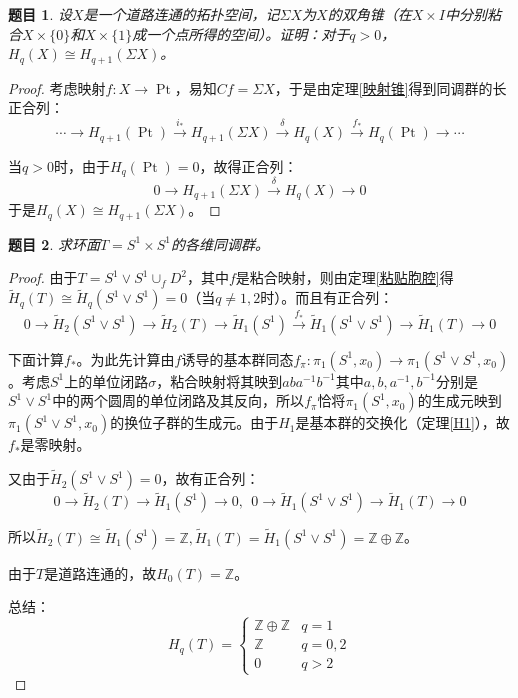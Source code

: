 \documentclass[UTF-8,11pt,fancyhdr,hyperref,titlepage]{ctexart}
\theoremstyle{question}
\newtheorem{timu}{题目}
\theoremstyle{theorem}
\theoremstyle{definition}
\theoremstyle{remark}
\def\ZZ{{\mathbb Z}}
\def\longto{\longrightarrow}
\def\To{\longto}
\newcommand{\markar}[1]{\stackrel{{#1}}{\longrightarrow}}%
\newcommand{\rH}[1]{\widetilde{H}_{#1}}
\DeclareMathOperator{\Pt}{Pt}
\begin{document}
\begin{timu}\label{24}
  设$X$是一个道路连通的拓扑空间，记$\Sigma X$为$X$的双角锥（在$X\times I$中分别粘合$X\times\{0\}$和$X\times\{1\}$成一个点所得的空间）。证明：对于$q>0$，$H_q(X)\cong H_{q+1}(\Sigma X)$。
\end{timu}
\begin{proof}
  考虑映射$f\colon X\To\Pt$，易知$Cf=\Sigma X$，于是由定理\ref{映射锥}得到同调群的长正合列：
  \begin{equation*}
    \cdots\To H_{q+1}(\Pt)\markar{i_{\ast}} H_{q+1}(\Sigma X)\markar{\delta} H_q(X)\markar{f_{\ast}} H_q(\Pt)\To\cdots
  \end{equation*}
  
  当$q>0$时，由于$H_q(\Pt)=0$，故得正合列：
  \begin{equation*}
    0\To H_{q+1}(\Sigma X)\markar{\delta} H_q(X)\To 0
  \end{equation*}
  于是$H_q(X)\cong H_{q+1}(\Sigma X)$。
\end{proof}

\begin{timu}\label{25}
  求环面$T=S^1\times S^1$的各维同调群。
\end{timu}
\begin{proof}
  由于$T=S^1\vee S^1\cup_fD^2$，其中$f$是粘合映射，则由定理\ref{粘贴胞腔}得$\rH{q}(T)\cong\rH{q}(S^1\vee S^1)=0$（当$q\neq 1,2$时）。而且有正合列：
  \begin{equation*}
    0\To \rH{2}(S^1\vee S^1)\To \rH{2}(T)\To \rH{1}(S^1) \markar{f_{\ast}} \rH{1}(S^1\vee S^1)\To \rH{1}(T) \To 0
  \end{equation*}
  
  下面计算$f_{\ast}$。为此先计算由$f$诱导的基本群同态$f_{\pi}\colon\pi_1(S^1,x_0)\To\pi_1(S^1\vee S^1,x_0)$。考虑$S^1$上的单位闭路$\sigma$，粘合映射将其映到$aba^{-1}b^{-1}$其中$a, b, a^{-1}, b^{-1}$分别是$S^1\vee S^1$中的两个圆周的单位闭路及其反向，所以$f_{\pi}$恰将$\pi_1(S^1,x_0)$的生成元映到$\pi_1(S^1\vee S^1,x_0)$的换位子群的生成元。由于$H_1$是基本群的交换化（定理\ref{H1}），故$f_{\ast}$是零映射。

  又由于$\rH{2}(S^1\vee S^1)=0$，故有正合列：
  \begin{equation*}
    0\To \rH{2}(T)\To \rH{1}(S^1)\To 0,\ \
    0\To \rH{1}(S^1\vee S^1)\To \rH{1}(T) \To 0
  \end{equation*}

  所以$\rH{2}(T)\cong\rH{1}(S^1)=\ZZ, \rH{1}(T)=\rH{1}(S^1\vee S^1)=\ZZ\oplus\ZZ$。

  由于$T$是道路连通的，故$H_0(T)=\ZZ$。

  总结：
  \begin{equation*}
    H_q(T)=
    \begin{cases}
      \ZZ\oplus\ZZ & q=1\\
      \ZZ & q=0,2\\
      0 & q>2
    \end{cases}
  \end{equation*}
\end{proof}
\end{document}
